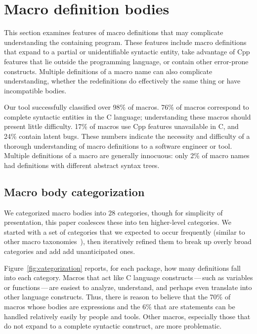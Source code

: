 \documentclass[10pt]{article}
\begin{document}
\section{Macro definition bodies}
\label{sec:categorization}

This section examines features of macro definitions that may complicate
understanding the containing program.  These features include macro definitions that
expand to a partial or unidentifiable syntactic entity, take advantage of
Cpp features that lie outside the programming language, or contain other
error-prone constructs.  Multiple definitions of a macro name can also
complicate understanding, whether the redefinitions do effectively the same
thing or have incompatible bodies.

Our tool successfully classified over 98\% of macros.
76\% of macros correspond to complete syntactic entities in the C language;
understanding these macros should present little difficulty.  17\% of
macros use Cpp features unavailable in C, and 24\% contain latent bugs.
These numbers indicate the necessity and difficulty of a thorough
understanding of macro definitions to a software engineer or tool.
Multiple definitions of a macro are generally innocuous:  only 2\% of macro
names had definitions with different abstract syntax trees.



\subsection{Macro body categorization}
\label{sec:categorization}

We categorized macro bodies into 28 categories, though for simplicity of
presentation, this paper coalesces these into ten higher-level categories.
We started with a set of categories that we expected to occur frequently
(similar to other macro
taxonomies~\cite{Stroustrup-DesignEvolution,Carroll95}), then iteratively
refined them to break up overly broad categories and add add unanticipated ones.

Figure~\ref{fig:categorization} reports, for each package, how many
definitions fall into each category.  Macros that
act like C language constructs\,---\,such as variables or
functions\,---\,are easiest to analyze, understand, and perhaps even
translate into other language constructs.  Thus, there is reason to believe
that the 70\% of macros whose bodies are expressions and the 6\% that are
statements can be handled relatively easily by people and tools.  Other
macros, especially those that do not expand to a complete syntactic
construct, are more problematic.
\end{document}

